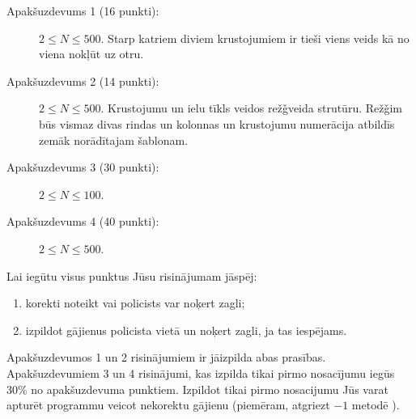 \documentclass{boi2014-lv}
\begin{document}
    \Scoring

    \begin{description}
        \item[Apakšuzdevums 1 (16 punkti):] $2 \le N \le 500$. Starp katriem diviem krustojumiem ir tieši viens veids kā no viena nokļūt uz otru.%
        \item[Apakšuzdevums 2 (14 punkti):] $2 \le N \le 500$.  Krustojumu un ielu tīkls veidos rež\v{g}veida strutūru. Rež\v{g}im būs vismaz divas rindas un kolonnas un krustojumu numerācija atbildīs zemāk norādītajam šablonam.
        \begin{figure}[h!]
           \centering
        \end{figure}
        \item[Apakšuzdevums 3 (30 punkti):] $2 \le N \le 100$.
        \item[Apakšuzdevums 4 (40 punkti):] $2 \le N \le 500$.
    \end{description}

	Lai iegūtu visus punktus Jūsu risinājumam jāspēj:
    \begin{enumerate}
    	\item korekti noteikt vai policists var noķert zagli;%
	\item izpildot gājienus policista vietā un noķert zagli, ja tas iespējams.%
    \end{enumerate}
    	Apakšuzdevumos 1 un 2 risinājumiem ir jāizpilda abas prasības.
	Apakšuzdevumiem 3 un 4 risinājumi, kas izpilda tikai pirmo nosacījumu iegūs 30\% no apakšuzdevuma punktiem. Izpildot tikai pirmo nosacijumu Jūs  varat apturēt programmu veicot nekorektu gājienu (piemēram, atgriezt $-1$ metodē ). 
\end{document}
